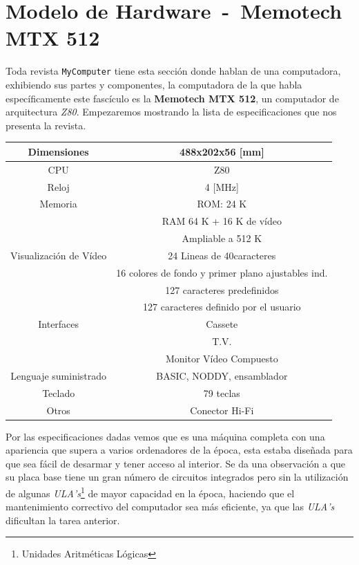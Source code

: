 \documentclass{article}
\begin{document}
\section{Modelo de Hardware\ -\ Memotech MTX 512}

Toda revista \texttt{MyComputer} tiene esta sección donde hablan de una computadora, exhibiendo sus partes y
componentes, la computadora de la que habla específicamente este fascículo es la \textbf{Memotech MTX 512},
un computador de arquitectura \textit{Z80}. Empezaremos mostrando la lista de especificaciones que nos presenta
la revista.

\begin{table}[h]
  \centering
  \begin{tabular}{|c||c|}
    \hline
    Dimensiones&488x202x56 [mm]\\\hline
    CPU&Z80\\\hline
    Reloj&4 [MHz]\\\hline
    Memoria&ROM: 24 K\\\cline{2-2}
               &RAM 64 K + 16 K de vídeo\\\cline{2-2}
               &Ampliable a 512 K\\\hline
    Visualización de Vídeo&24 Lineas de 40caracteres\\\cline{2-2}
               &16 colores de fondo y primer plano ajustables ind.\\\cline{2-2}
               &127 caracteres predefinidos\\\cline{2-2}
               &127 caracteres definido por el usuario\\\hline
    Interfaces&Cassete\\\cline{2-2}
               &T.V.\\\cline{2-2}
               &Monitor Vídeo Compuesto\\\hline
    Lenguaje suministrado& BASIC, NODDY, ensamblador\\\hline
    Teclado&79 teclas\\\hline
    Otros&Conector Hi-Fi\\\hline
  \end{tabular}
\end{table}

Por las especificaciones dadas vemos que es una máquina completa con una apariencia que supera a varios
ordenadores de la época, esta estaba diseñada para que sea fácil de desarmar y tener  acceso al interior.
Se da una observación a que su placa base tiene un gran número de circuitos integrados pero sin la
utilización de algunas \textit{ULA's}\footnote{Unidades Aritméticas Lógicas} de mayor capacidad en la época,
haciendo que el mantenimiento correctivo del computador sea más eficiente, ya que las \textit{ULA's}
dificultan la tarea anterior.
\end{document}
